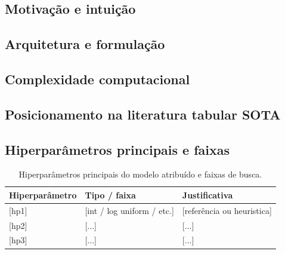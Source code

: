 \documentclass[11pt,a4paper]{article}
\begin{document}

\subsection{Motivação e intuição}

\subsection{Arquitetura e formulação}

\subsection{Complexidade computacional}

\subsection{Posicionamento na literatura tabular SOTA}

\subsection{Hiperparâmetros principais e faixas}

\begin{table}[h]
\centering
\caption{Hiperparâmetros principais do modelo atribuído e faixas de busca.}
\label{tab:hp}
\begin{tabular}{l p{4.5cm} p{6.0cm}}
\toprule
\textbf{Hiperparâmetro} & \textbf{Tipo / faixa} & \textbf{Justificativa} \\
\midrule
{}[hp1] & [int / log uniform / etc.] & [referência ou heuristica] \\
{}[hp2] & [...]                       & [...] \\
{}[hp3] & [...]                       & [...] \\
\bottomrule
\end{tabular}
\end{table}
\end{document}
